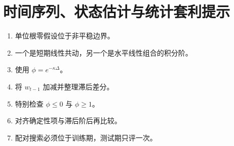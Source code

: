 \chapter{时间序列、状态估计与统计套利提示}
\begin{enumerate}[leftmargin=*]
  \item 单位根零假设位于非平稳边界。
  \item 一个是短期线性共动，另一个是水平线性组合的积分阶。
  \item 使用 $\phi=e^{-\kappa\Delta}$。
  \item 将 $w_{t-1}$ 加减并整理滞后差分。
  \item 特别检查 $\phi\le0$ 与 $\phi\ge1$。
  \item 对齐确定性项与滞后阶后再比较。
  \item 配对搜索必须位于训练期，测试期只评一次。
\end{enumerate}

